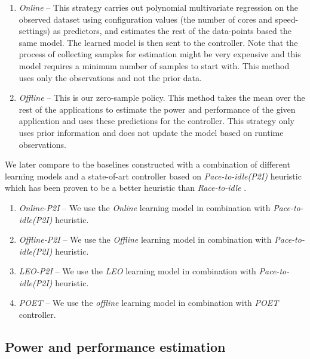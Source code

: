 \begin{enumerate}
\item \textit{Online} -- This strategy carries out polynomial
  multivariate regression on the observed dataset using configuration
  values (the number of cores and speed-settings) as predictors, and
  estimates the rest of the data-points based the same model. The
  learned model is then sent to the controller. Note that the process
  of collecting samples for estimation might be very expensive and
  this model requires a minimum number of samples to start with. This
  method uses only the observations and not the prior data.
\item \textit{Offline} -- This is our zero-sample policy. This method
  takes the mean over the rest of the applications to estimate the
  power and performance of the given application and uses these
  predictions for the controller.  This strategy only uses prior
  information and does not update the model based on runtime
  observations.
\end{enumerate}
We later compare \SYSTEM{} to the baselines constructed with a
combination of different learning models and a state-of-art controller
based on \emph{Pace-to-idle(P2I)} heuristic which has been proven to
be a better heuristic than \emph{Race-to-idle} \cite{RACINGPACING}.
\begin{enumerate}
\item \textit{Online-P2I} -- We use the \textit{Online} learning model
  in combination with \emph{Pace-to-idle(P2I)} heuristic.
\item \textit{Offline-P2I} -- We use the \textit{Offline} learning
  model in combination with \emph{Pace-to-idle(P2I)} heuristic.
\item \textit{LEO-P2I} -- We use the \textit{LEO} learning model in
  combination with \emph{Pace-to-idle(P2I)} heuristic.
\item \textit{POET} -- We use the \textit{offline} learning model in
  combination with \emph{POET} controller.
\end{enumerate}

\subsection{Power and performance estimation}

